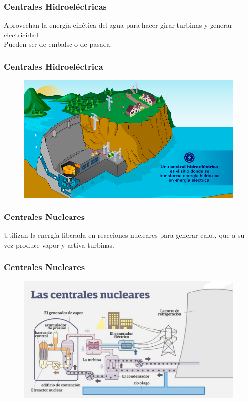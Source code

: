 \documentclass[14pt]{beamer}
\begin{document}
\begin{frame}
\frametitle{Centrales Hidroeléctricas}
Aprovechan la energía cinética del agua para hacer girar turbinas y generar electricidad.
\\
\bigskip
\pause
Pueden ser de embalse o de pasada.
\end{frame}
\begin{frame}
\frametitle{Centrales Hidroeléctrica}
\vspace*{-1cm}
\begin{figure}
    \centering
    \includegraphics[scale=0.35]{Imagenes/Planta_Hidroelectrica.png}
\end{figure}
\end{frame}
\begin{frame}
\frametitle{Centrales Nucleares}
Utilizan la energía liberada en reacciones nucleares para generar calor, que a su vez produce vapor y activa turbinas.
\end{frame}
\begin{frame}
\frametitle{Centrales Nucleares}
\vspace*{-1cm}
\begin{figure}
    \centering
    \includegraphics[scale=0.35]{Imagenes/Planta_Nuclear.jpeg}
\end{figure}
\end{frame}
\end{document}
